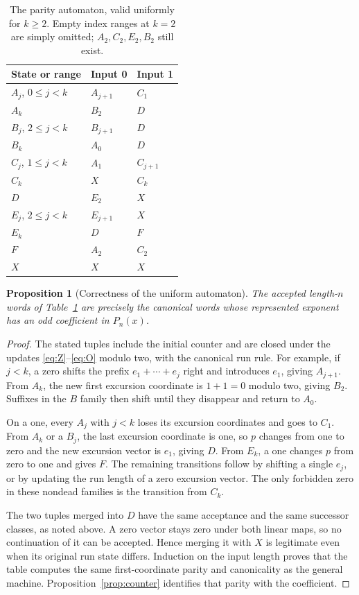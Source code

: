 \documentclass[11pt,letterpaper]{article}
\numberwithin{equation}{section}
\newtheorem{proposition}[theorem]{Proposition}
\theoremstyle{definition}
\theoremstyle{remark}
\begin{document}
\begin{table}[htbp]
\centering
\renewcommand{\arraystretch}{1.15}
\begin{tabular}{lll}
\toprule
State or range & Input 0 & Input 1\\
\midrule
$A_j$, $0\le j<k$ & $A_{j+1}$ & $C_1$\\
$A_k$ & $B_2$ & $D$\\
$B_j$, $2\le j<k$ & $B_{j+1}$ & $D$\\
$B_k$ & $A_0$ & $D$\\
$C_j$, $1\le j<k$ & $A_1$ & $C_{j+1}$\\
$C_k$ & $X$ & $C_k$\\
$D$ & $E_2$ & $X$\\
$E_j$, $2\le j<k$ & $E_{j+1}$ & $X$\\
$E_k$ & $D$ & $F$\\
$F$ & $A_2$ & $C_2$\\
$X$ & $X$ & $X$\\
\bottomrule
\end{tabular}
\caption{The parity automaton, valid uniformly for $k\ge2$. Empty index
ranges at $k=2$ are simply omitted; $A_2,C_2,E_2,B_2$ still exist.}
\label{tab:parity}
\end{table}

\begin{proposition}[Correctness of the uniform automaton]
\label{prop:parity}
The accepted length-$n$ words of Table~\ref{tab:parity} are precisely the
canonical words whose represented exponent has an odd coefficient in
$P_n(x)$.
\end{proposition}
\begin{proof}
The stated tuples include the initial counter and are closed under the
updates \eqref{eq:Z}--\eqref{eq:O} modulo two, with the canonical run rule.
For example, if $j<k$, a zero shifts the prefix $e_1+\cdots+e_j$ right and
introduces $e_1$, giving $A_{j+1}$. From $A_k$, the new first excursion
coordinate is $1+1=0$ modulo two, giving $B_2$. Suffixes in the $B$ family
then shift until they disappear and return to $A_0$.

On a one, every $A_j$ with $j<k$ loses its excursion coordinates and goes
to $C_1$. From $A_k$ or a $B_j$, the last excursion coordinate is one, so
$p$ changes from one to zero and the new excursion vector is $e_1$, giving
$D$. From $E_k$, a one changes $p$ from zero to one and gives $F$.
The remaining transitions follow by shifting a single $e_j$, or by
updating the run length of a zero excursion vector. The only forbidden
zero in these nondead families is the transition from $C_k$.

The two tuples merged into $D$ have the same acceptance and the same
successor classes, as noted above. A zero vector stays zero under both
linear maps, so no continuation of it can be accepted. Hence merging it
with $X$ is legitimate even when its original run state differs.
Induction on the input length proves that the table computes the same
first-coordinate parity and canonicality as the general machine.
Proposition~\ref{prop:counter} identifies that parity with the coefficient.
\end{proof}
\end{document}
